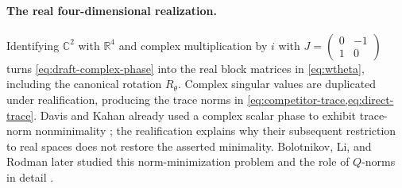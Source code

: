 \begin{tcolorbox}
\paragraph{The real four-dimensional realization.}
Identifying $\mathbb C^2$ with $\mathbb R^4$ and complex multiplication by
$i$ with $J=\left(\begin{smallmatrix}0&-1\\1&0\end{smallmatrix}\right)$
turns \cref{eq:draft-complex-phase} into the real block matrices in
\cref{eq:wtheta}, including the canonical rotation $R_\theta$. Complex
singular values are duplicated under realification, producing the trace
norms in \cref{eq:competitor-trace,eq:direct-trace}. Davis and Kahan already
used a complex scalar phase to exhibit trace-norm nonminimality
\citep[Example~4.2]{davis1970rotation}; the realification explains why
their subsequent restriction to real spaces does not restore the asserted
minimality. Bolotnikov, Li, and Rodman later studied this norm-minimization
problem and the role of $Q$-norms in detail
\citep{bolotnikov2001minimal}.


\end{tcolorbox}
